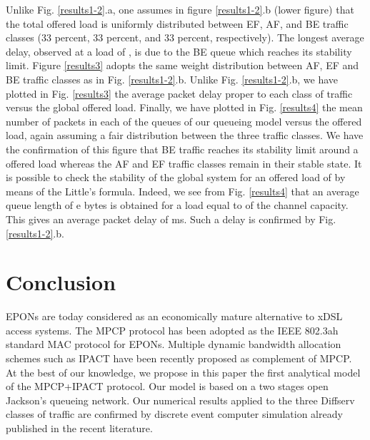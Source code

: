 \documentclass[a4paper,10pt]{IEEEtran}
\begin{document}
Unlike Fig. \ref{results1-2}.a, one assumes in figure
\ref{results1-2}.b (lower figure) that the total offered load is
uniformly distributed between EF, AF, and BE traffic classes (33
percent, 33 percent, and 33 percent, respectively). The longest
average delay, observed at a load of , is due to the BE queue
which reaches its stability limit. Figure \ref{results3} adopts the
same weight distribution between AF, EF and BE traffic classes as in
Fig. \ref{results1-2}.b. Unlike Fig. \ref{results1-2}.b, we have
plotted in Fig. \ref{results3} the average packet delay proper to
each class of traffic versus the global offered load. Finally, we
have plotted in Fig. \ref{results4} the mean number of packets in
each of the  queues of our queueing model versus the offered
load, again assuming a fair distribution between the three traffic
classes. We have the confirmation of this figure that BE traffic
reaches its stability limit around a  offered load whereas the
AF and EF traffic classes remain in their stable state. It is
possible to check the stability of the global system for an offered
load of  by means of the Little's formula. Indeed, we see from
Fig. \ref{results4} that an average queue length of e bytes
is obtained for a load equal to  of the channel capacity. This
gives an average packet delay of  ms. Such a delay is
confirmed by Fig. \ref{results1-2}.b.

\section{Conclusion}
EPONs are today considered as an economically mature alternative to
xDSL access systems. The MPCP protocol has been adopted as the IEEE
802.3ah standard MAC protocol for EPONs. Multiple dynamic bandwidth
allocation schemes such as IPACT have been recently proposed as
complement of MPCP. At the best of our knowledge, we propose in this
paper the first analytical model of the MPCP+IPACT protocol. Our
model is based on a two stages open Jackson's queueing network. Our
numerical results applied to the three Diffserv classes of traffic
are confirmed by discrete event computer simulation already
published in the recent literature.


\end{document}
